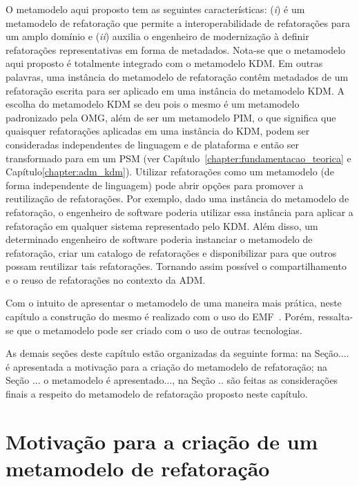 O metamodelo aqui proposto tem as seguintes características: (\textit{i}) é um metamodelo de refatoração que permite a interoperabilidade de refatorações para um amplo domínio e (\textit{ii}) auxilia o engenheiro de modernização à definir refatorações representativas em forma de metadados. Nota-se que o metamodelo aqui proposto é totalmente integrado com o metamodelo KDM. Em outras palavras, uma instância do metamodelo de refatoração contêm metadados de um refatoração escrita para ser aplicado em uma instância do metamodelo KDM. A escolha do metamodelo KDM se deu pois o mesmo é um metamodelo padronizado pela OMG, além de ser um metamodelo PIM, o que significa que quaisquer refatorações aplicadas em uma instância do KDM, podem ser consideradas independentes de linguagem e de plataforma e então ser transformado para em um PSM (ver Capítulo~\ref{chapter:fundamentacao_teorica} e Capítulo\ref{chapter:adm_kdm}). Utilizar refatorações como um metamodelo (de forma independente de linguagem) pode abrir opções para promover a reutilização de refatorações. Por exemplo, dado uma instância do metamodelo de refatoração, o engenheiro de software poderia utilizar essa instância para aplicar a refatoração em qualquer sistema representado pelo KDM. Além disso, um determinado engenheiro de software poderia instanciar o metamodelo de refatoração, criar um catalogo de refatorações e disponibilizar para que outros possam reutilizar tais refatorações. Tornando assim possível o compartilhamento e o reuso de refatorações no contexto da ADM.

Com o intuito de apresentar o metamodelo de uma maneira mais prática, neste capítulo a construção do mesmo é realizado com o uso do EMF~\cite{EMF}. Porém, ressalta-se que o metamodelo pode ser criado com o uso de outras tecnologias.

As demais seções deste capítulo estão organizadas da seguinte forma: na Seção.... é apresentada a motivação para a criação do metamodelo de refatoração; na Seção ... o metamodelo é apresentado..., na Seção .. são feitas as considerações finais a respeito do metamodelo de refatoração proposto neste capítulo.

\section{Motivação para a criação de um metamodelo de refatoração} %
\label{sec:motiva_o_para_a_cria_o_de_um_meta_modelo_de_refatora_o}

